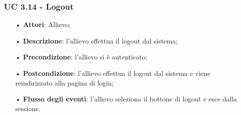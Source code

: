 \subsubsection{UC 3.14 - Logout}
\begin{itemize}
    \item[•] \textbf{Attori}: Allievo;
    \item[•] \textbf{Descrizione}: l'allievo effettua il logout dal sistema;
    \item[•] \textbf{Precondizione}: l'allievo si è autenticato;
    \item[•] \textbf{Postcondizione}: l'allievo effettua il logout dal sistema e viene reindirizzato alla pagina di login;
    \item[•] \textbf{Flusso degli eventi}: l'allievo seleziona il bottone di logout e esce dalla sessione.
\end{itemize}